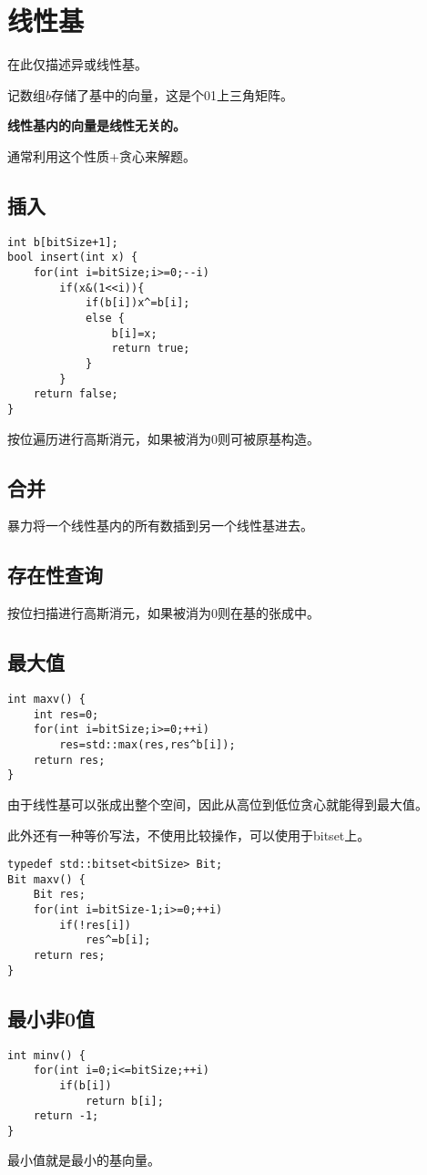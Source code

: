 \section{线性基}
在此仅描述异或线性基。

记数组$b$存储了基中的向量，这是个01上三角矩阵。

\begin{property}
    {\bfseries 线性基内的向量是线性无关的。}
\end{property}
通常利用这个性质+贪心来解题。
\subsection{插入}
\begin{lstlisting}
int b[bitSize+1];
bool insert(int x) {
    for(int i=bitSize;i>=0;--i)
        if(x&(1<<i)){
            if(b[i])x^=b[i];
            else {
                b[i]=x;
                return true;
            }
        }
    return false;
}
\end{lstlisting}
按位遍历进行高斯消元，如果被消为0则可被原基构造。
\subsection{合并}
暴力将一个线性基内的所有数插到另一个线性基进去。
\subsection{存在性查询}
按位扫描进行高斯消元，如果被消为0则在基的张成中。
\subsection{最大值}
\begin{lstlisting}
int maxv() {
    int res=0;
    for(int i=bitSize;i>=0;++i)
        res=std::max(res,res^b[i]);
    return res;
}
\end{lstlisting}
由于线性基可以张成出整个空间，因此从高位到低位贪心就能得到最大值。

此外还有一种等价写法，不使用比较操作，可以使用于bitset上。
\begin{lstlisting}
typedef std::bitset<bitSize> Bit;
Bit maxv() {
    Bit res;
    for(int i=bitSize-1;i>=0;++i)
        if(!res[i])
            res^=b[i];
    return res;
}
\end{lstlisting}
\subsection{最小非0值}
\begin{lstlisting}
int minv() {
    for(int i=0;i<=bitSize;++i)
        if(b[i])
            return b[i];
    return -1;
}
\end{lstlisting}
最小值就是最小的基向量。

